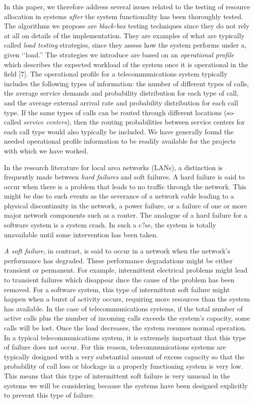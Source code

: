 \documentclass[journal, twoside]{IEEEtran}
\begin{document}
In this paper, we therefore address several issues related to
the testing of resource allocation in systems \textit{after} the system
functionality has been thoroughly tested. The algorithms we
propose are \textit{black-box} testing techniques since they do not rely
at all on details of the implementation. They are examples of
what are typically called \textit{load testing} strategies, since they
assess how the system performs under a, given ‘‘load.’’ The
strategies we introduce are based on an \textit{operational profile}
which describes the expected workload of the system once it is
operational in the field [7]. The operational profile for a telecommunications system typically includes the following types
of information: the number of different types of calls, the average service demands and probability distribution for each type
of call, and the average external arrival rate and probability
distribution for each call type. If the same types of calls can be routed through different locations (so-called \textit{service centers}),
then the routing probabilities between service centers for each
call type would also typically be included. We have generally
found the needed operational profile information to be readily
available for the projects with which we have worked.

In the research literature for local area networks (LANs), a
distinction is frequently made between \textit{hard failures} and soft
failures. A hard failure is said to occur when there is a problem that leads to no traffic through the network. This might be
due to such events as the severance of a network cable leading
to a physical discontinuity in the network, a power failure, or a
failure of one or more major network components such as a
router. The analogue of a hard failure for a software system is
a system crash. In such a c?se, the system is totally unavailable
until some intervention has been taken.

\textit{A soft failure}, in contrast, is said to occur in a network when
the network’s performance has degraded. These performance
degradations might be either transient or permanent. For example, intermittent electrical problems might lead to transient
failures which disappear dnce the cause of the problem has
been removed. For a software system, this type of intermittent
soft failure might happen when a burst of activity occurs, requiring more resources than the system has available. In the
case of telecommunications systems, if the total number of
active calls plus the number of incoming calls exceeds the
system’s capacity, some calls will be lost. Once the load decreases, the system resumes normal operation. In a typical
telecommunications system, it is extremely important that this
type of failure does not occur. For this reason, telecommunications systems are typically designed with a very substantial
amount of excess capacity so that the probability of call loss or
blockage in a properly functioning system is very low. This
means that this type of intermittent soft failure is very unusual
in the systems we will be considering because the systems
have been designed explicitly to prevent this type of failure.
 
\end{document}
